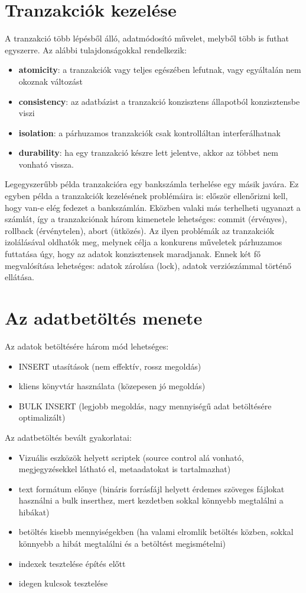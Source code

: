 \documentclass[12pt]{article}
\theoremstyle{plain}
\begin{document}
\section{Tranzakciók kezelése}

A tranzakció több lépésből álló, adatmódosító művelet, melyből több is futhat egyszerre. Az alábbi tulajdonságokkal rendelkezik:
\begin{itemize}
    \item \textbf{atomicity}: a tranzakciók vagy teljes egészében lefutnak, vagy egyáltalán nem okoznak változást
    \item \textbf{consistency}: az adatbázist a tranzakció konzisztens állapotból konzisztensbe viszi
    \item \textbf{isolation}: a párhuzamos tranzakciók csak kontrolláltan interferálhatnak
    \item \textbf{durability}: ha egy tranzakció készre lett jelentve, akkor az többet nem vonható vissza.
\end{itemize}{}
Legegyszerűbb példa tranzakcióra egy bankszámla terhelése egy másik javára. Ez egyben példa a tranzakciók kezelésének problémáira is: először ellenőrizni kell, hogy van-e elég fedezet a bankszámlán. Eközben valaki más terhelheti ugyanazt a számlát, így a tranzakciónak három kimenetele lehetséges: commit (érvényes), rollback (érvénytelen), abort (ütközés).
Az ilyen problémák az tranzakciók izolálásával oldhatók meg, melynek célja a konkurens műveletek párhuzamos futtatása úgy, hogy az adatok konzisztensek maradjanak. Ennek két fő megvalósítása lehetséges: adatok zárolása (lock), adatok verziószámmal történő ellátása.


\section{Az adatbetöltés menete}

Az adatok betöltésére három mód lehetséges:
\begin{itemize}
    \item INSERT utasítások (nem effektív, rossz megoldás)
    \item kliens könyvtár használata (közepesen jó megoldás)
    \item BULK INSERT (legjobb megoldás, nagy mennyiségű adat betöltésére optimalizált)
\end{itemize}{}

Az adatbetöltés bevált gyakorlatai:
\begin{itemize}
    \item Vizuális eszközök helyett scriptek (source control alá vonható, megjegyzésekkel látható el, metaadatokat is tartalmazhat)
    \item text formátum előnye (bináris forrásfájl helyett érdemes szöveges fájlokat használni a bulk inserthez, mert kezdetben sokkal könnyebb megtalálni a hibákat)
    \item betöltés kisebb mennyiségekben (ha valami elromlik betöltés közben, sokkal könnyebb a hibát megtalálni és a betöltést megismételni)
    \item indexek tesztelése építés előtt
    \item idegen kulcsok tesztelése
\end{itemize}{}
\end{document}
